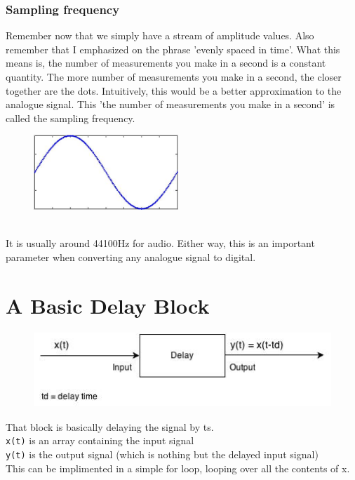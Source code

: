\documentclass{article}
\begin{document}
\subsubsection*{Sampling frequency}
Remember now that we simply have a stream of amplitude values. 
Also remember that I emphasized on the phrase 'evenly spaced in time'.
What this means is, the number of measurements you make in a second is a constant quantity. 
The more number of measurements you make in a second, the closer together are the dots. 
Intuitively, this would be a better approximation to the analogue signal. This 
'the number of measurements you make in a second' is called the sampling frequency. 	
\begin{figure}[h]
\begin{center}
\includegraphics[height=80pt]{../pictures/image101.jpg}
\end{center}
\end{figure}
\newline \\ It is usually around 44100Hz for audio. Either way, this is an important parameter 
when converting any analogue signal to digital.
\section*{A Basic Delay Block}
\begin{figure}[h]
\begin{center}
\includegraphics[height=80pt]{../pictures/image3.jpg}
\end{center}
\end{figure}
That block is basically delaying the signal by ts. 
\newline \\ \texttt{x(t)} is an array containing the input signal
\newline \\ \texttt{y(t)} is the output signal (which is nothing but the delayed input signal)
\newline \\This can be implimented in a simple for loop, looping over all the contents of x. 
\end{document}
